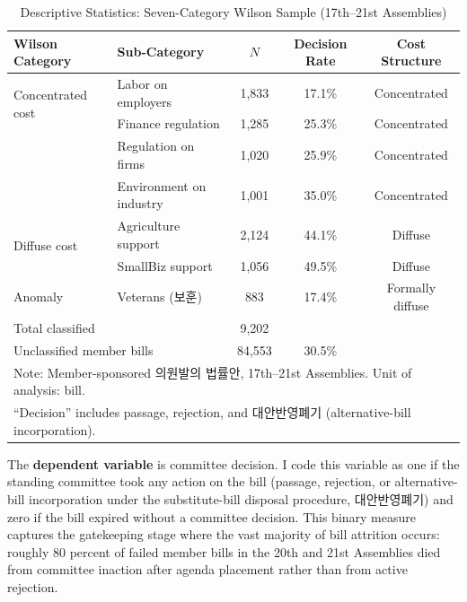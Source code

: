 \documentclass[11pt]{article}
\begin{document}
\begin{table}[H]
\centering
\caption{Descriptive Statistics: Seven-Category Wilson Sample (17th--21st Assemblies)}
\label{tab:desc}
\begin{tabular}{llccc}
\toprule
Wilson Category & Sub-Category & $N$ & Decision Rate & Cost Structure \\
\midrule
\multirow{2}{*}{Concentrated cost} & Labor on employers & 1,833 & 17.1\% & Concentrated \\
 & Finance regulation & 1,285 & 25.3\% & Concentrated \\
 & Regulation on firms & 1,020 & 25.9\% & Concentrated \\
 & Environment on industry & 1,001 & 35.0\% & Concentrated \\
\midrule
\multirow{2}{*}{Diffuse cost} & Agriculture support & 2,124 & 44.1\% & Diffuse \\
 & SmallBiz support & 1,056 & 49.5\% & Diffuse \\
\midrule
Anomaly & Veterans (보훈) & 883 & 17.4\% & Formally diffuse \\
\midrule
\multicolumn{2}{l}{Total classified} & 9,202 & & \\
\multicolumn{2}{l}{Unclassified member bills} & 84,553 & 30.5\% & \\
\bottomrule
\multicolumn{5}{l}{\footnotesize Note: Member-sponsored 의원발의 법률안, 17th--21st Assemblies. Unit of analysis: bill.} \\
\multicolumn{5}{l}{\footnotesize ``Decision'' includes passage, rejection, and 대안반영폐기 (alternative-bill incorporation).} \\
\end{tabular}
\end{table}

The \textbf{dependent variable} is committee decision. I code this variable as one if the standing committee took any action on the bill (passage, rejection, or alternative-bill incorporation under the substitute-bill disposal procedure, 대안반영폐기) and zero if the bill expired without a committee decision. This binary measure captures the gatekeeping stage where the vast majority of bill attrition occurs: roughly 80 percent of failed member bills in the 20th and 21st Assemblies died from committee inaction after agenda placement rather than from active rejection.
\end{document}
